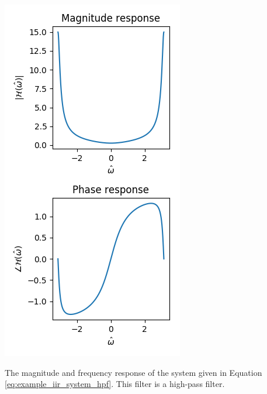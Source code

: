 \begin{marginfigure}
\includegraphics[width=\textwidth]{code/026_iir/z_mag_angle_iir2.png}
\caption{The magnitude and frequency response of the system given in Equation \ref{eq:example_iir_system_hpf}. This filter is a high-pass filter.}
\label{fig:pz_diag2}
\end{marginfigure}

